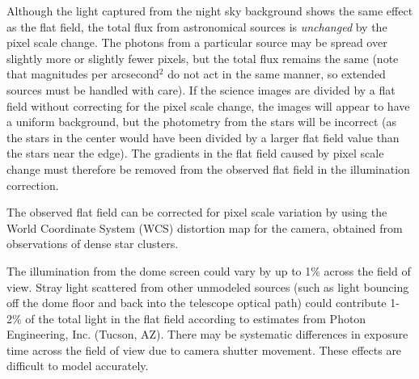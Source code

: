 \documentclass[12pt,preprint]{aastex}
\begin{document}
Although the light captured from the night sky background shows the
same effect as the flat field, the total flux from astronomical
sources is {\it unchanged} by the pixel scale change.  The photons
from a particular source may be spread over slightly more or slightly
fewer pixels, but the total flux remains the same (note that
magnitudes per arcsecond$^{2}$ do not act in the same manner, so
extended sources must be handled with care). If the science images are
divided by a flat field without correcting for the pixel scale change,
the images will appear to have a uniform background, but the
photometry from the stars will be incorrect (as the stars in the
center would have been divided by a larger flat field value than the
stars near the edge). The gradients in the flat field caused by pixel
scale change must therefore be removed from the observed flat field in
the illumination correction.

The observed flat field can be corrected for pixel scale variation by
using the World Coordinate System (WCS) distortion map for the camera,
obtained from observations of dense star clusters. 

\label{sec:stray/scattered}

The illumination from the dome screen could vary by up to 1\% across
the field of view. Stray light scattered from other unmodeled sources
(such as light bouncing off the dome floor and back into the telescope
optical path) could contribute 1-2\% of the total light in the flat
field according to estimates from Photon Engineering, Inc. (Tucson,
AZ).  There may be systematic differences in exposure time across the
field of view due to camera shutter movement. These effects are
difficult to model accurately. 
\end{document}
